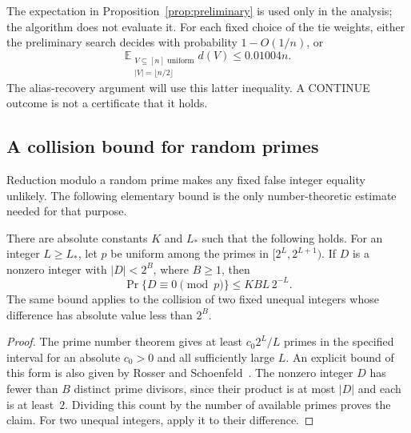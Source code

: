 The expectation in Proposition~\ref{prop:preliminary} is used only in
the analysis; the algorithm does not evaluate it.  For each fixed
choice of the tie weights, either the preliminary search decides with
probability $1-O(1/n)$, or
\begin{equation}
\label{eq:low-deficiency}
 \mathbb E_{\substack{V\subseteq[n]\text{ uniform}\\
                      |V|=\lfloor n/2\rfloor}}d(V)
 \le0.01004n.
\end{equation}
The alias-recovery argument will use this latter inequality.
A \textup{CONTINUE} outcome is not a certificate that it holds.

\subsection{A collision bound for random primes}

Reduction modulo a random prime makes any fixed false integer equality
unlikely.  The following elementary bound is the only number-theoretic
estimate needed for that purpose.

\begin{lemma}
\label{lem:prime-collision}
There are absolute constants $K$ and $L_*$ such that the following
holds.  For an integer $L\ge L_*$, let $p$ be uniform among the primes
in $[2^L,2^{L+1})$.  If $D$ is a nonzero integer with $|D|<2^B$, where
$B\ge1$, then
\[
 \Pr\{D\equiv0\pmod p\}\le KBL\,2^{-L}.
\]
The same bound applies to the collision of two fixed unequal integers
whose difference has absolute value less than $2^B$.
\end{lemma}

\begin{proof}
The prime number theorem gives at least $c_0 2^L/L$ primes in the
specified interval for an absolute $c_0>0$ and all sufficiently large
$L$.  An explicit bound of this form is also given by
Rosser and Schoenfeld~\cite[Corollary~3]{RosserSchoenfeld1962}.
The nonzero integer $D$ has fewer than $B$ distinct prime divisors,
since their product is at most $|D|$ and each is at least~$2$.
Dividing this count by the number of available primes proves the
claim.  For two unequal integers, apply it to their difference.
\end{proof}
